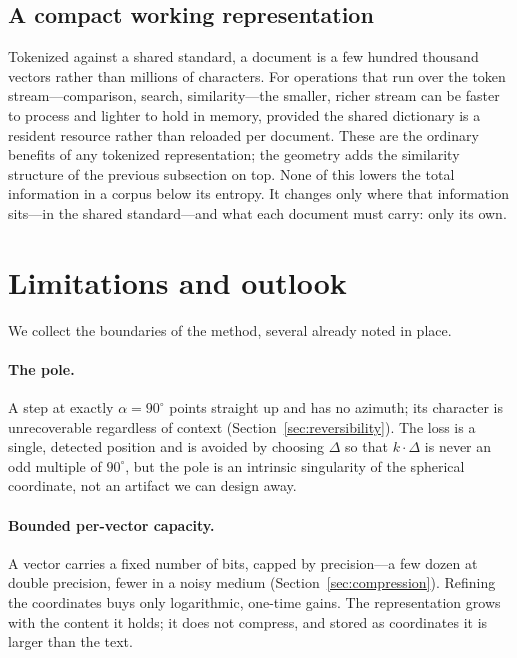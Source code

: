 \documentclass[11pt]{article}
\renewcommand{\deg}{^{\circ}}  %
\begin{document}
\subsection{A compact working representation}

Tokenized against a shared standard, a document is a few hundred thousand vectors rather than
millions of characters. For operations that run over the token stream---comparison, search,
similarity---the smaller, richer stream can be faster to process and lighter to hold in
memory, provided the shared dictionary is a resident resource rather than reloaded per
document. These are the ordinary benefits of any tokenized representation; the geometry adds
the similarity structure of the previous subsection on top. None of this lowers the total
information in a corpus below its entropy. It changes only where that information sits---in the
shared standard---and what each document must carry: only its own.

\section{Limitations and outlook}\label{sec:limitations}

We collect the boundaries of the method, several already noted in place.

\paragraph{The pole.} A step at exactly $\alpha=90\deg$ points straight up and has no azimuth;
its character is unrecoverable regardless of context (Section~\ref{sec:reversibility}). The
loss is a single, detected position and is avoided by choosing $\Delta$ so that $k\cdot\Delta$
is never an odd multiple of $90\deg$, but the pole is an intrinsic singularity of the spherical
coordinate, not an artifact we can design away.

\paragraph{Bounded per-vector capacity.} A vector carries a fixed number of bits, capped by
precision---a few dozen at double precision, fewer in a noisy medium
(Section~\ref{sec:compression}). Refining the coordinates buys only logarithmic, one-time
gains. The representation grows with the content it holds; it does not compress, and stored as
coordinates it is larger than the text.
\end{document}
